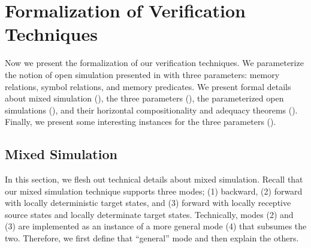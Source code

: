 \section{Formalization of Verification Techniques}
\label{sec:compiler:technique}

Now we present the formalization of our verification techniques.
We parameterize the notion of open simulation presented in
 with three parameters: memory relations, symbol
relations, and memory predicates.  We present formal details about
mixed simulation (),
the three parameters (),
the parameterized open simulations (), and
their horizontal compositionality and adequacy theorems ().
Finally, we present some interesting instances for the three parameters ().

\subsection{Mixed Simulation}
\label{sec:main-verification:mixedsim}
In this section, we flesh out technical details about mixed simulation.
Recall that our mixed simulation technique supports three modes; (1) backward, (2) forward with locally deterministic target states, and (3) forward with locally receptive source states and locally determinate target states.
Technically, modes (2) and (3) are implemented as an instance of a more general mode (4) that subsumes the two.
Therefore, we first define that ``general'' mode and then explain the others.

